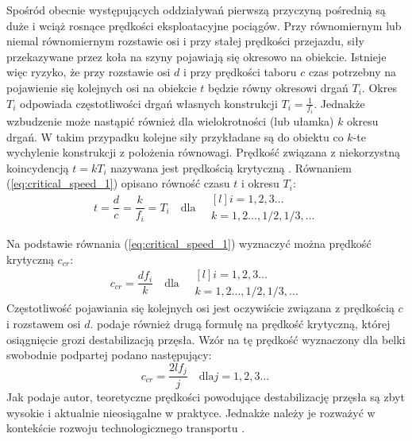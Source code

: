 Spośród obecnie występujących oddziaływań pierwszą przyczyną pośrednią są duże i wciąż rosnące prędkości eksploatacyjne pociągów. Przy równomiernym lub niemal równomiernym rozstawie osi i przy stałej prędkości przejazdu, siły przekazywane przez koła na szyny pojawiają się okresowo na obiekcie. Istnieje więc ryzyko, że przy rozstawie osi $d$ i przy prędkości taboru $c$ czas potrzebny na pojawienie się kolejnych osi na obiekcie $t$ będzie równy okresowi drgań $T_i$. Okres $T_i$ odpowiada częstotliwości drgań własnych konstrukcji $T_i=\frac{1}{f_i}$. Jednakże wzbudzenie może nastąpić również dla wielokrotności (lub ułamka) $k$ okresu drgań. W takim przypadku kolejne siły przykładane są do obiektu co $k$-te wychylenie konstrukcji z położenia równowagi. Prędkość związana z niekorzystną koincydencją $t=kT_i$ nazywana jest prędkością krytyczną . Równaniem (\ref{eq:critical_speed_1}) opisano równość czasu $t$ i okresu $T_i$:
\begin{equation} \label{eq:critical_speed_1}
	t=\frac{d}{c}=\frac{k}{f_i}=T_i \quad\text{dla}\quad
	\begin{matrix*}[l]
		i=1,2,3\dots\ \\
		k=1,2\dots,1/2,1/3,\dots
	\end{matrix*}
\end{equation}

Na podstawie równania (\ref{eq:critical_speed_1}) wyznaczyć można prędkość krytyczną $c_{cr}$:
\begin{equation} \label{eq:critical_speed_2}
	c_{cr}=\frac{df_i}{k}\quad \text{dla}\quad
		\begin{matrix*}[l]
		i=1,2,3\dots\ \\
		k=1,2\dots,1/2,1/3,\dots
	\end{matrix*}
\end{equation}
Częstotliwość pojawiania się kolejnych osi jest oczywiście związana z prędkością $c$ i rozstawem osi $d$. \cite{Fryba2001} podaje również drugą formułę na prędkość krytyczną, której osiągnięcie grozi destabilizacją przęsła. Wzór na tę prędkość wyznaczony dla belki swobodnie podpartej podano następujący:
\begin{equation}
	c_{cr}=\frac{2lf_j}{j}\quad\text{dla}j=1,2,3\dots\ 
\end{equation}
Jak podaje autor, teoretyczne prędkości powodujące destabilizację przęsła są zbyt wysokie i aktualnie nieosiągalne w praktyce. Jednakże należy je rozważyć w kontekście rozwoju technologicznego transportu \parencite{Ladislav2008}.

